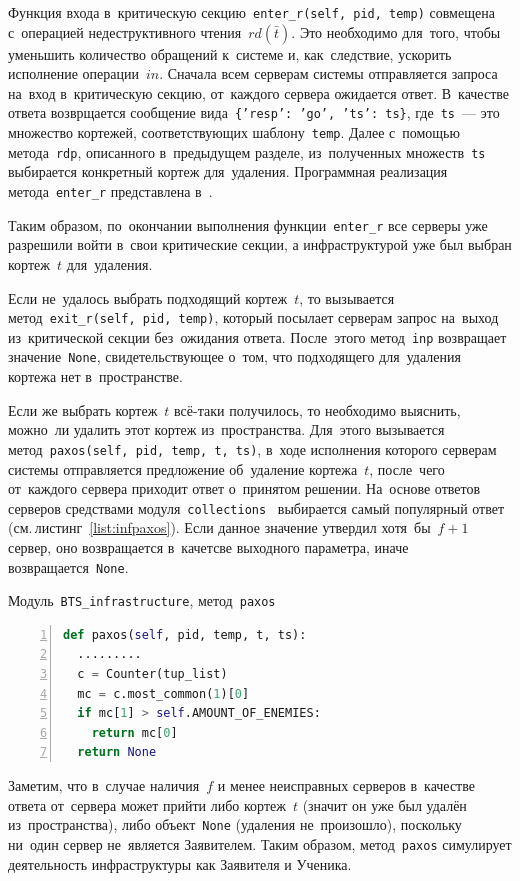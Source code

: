 Функция входа в~критическую секцию~\texttt{enter_r(self, pid, temp)} совмещена с~операцией недеструктивного чтения~$rd(\bar t)$. Это необходимо для~того, чтобы уменьшить количество обращений к~системе и, как~следствие, ускорить исполнение операции~$in$. Сначала всем серверам системы отправляется запроса на~вход в~критическую секцию, от~каждого сервера ожидается ответ. В~качестве ответа возврщается сообщение вида~\texttt{\{'resp': 'go', 'ts': ts\}}, где~\texttt{ts}~--- это множество кортежей, соответствующих шаблону~\texttt{temp}. Далее с~помощью метода~\texttt{rdp}, описанного в~предыдущем разделе, из~полученных множеств~\texttt{ts} выбирается конкретный кортеж для~удаления. Программная реализация метода~\texttt{enter_r} представлена в~\autocite{mybts}.
		
Таким образом, по~окончании выполнения функции~\texttt{enter_r} все серверы уже разрешили войти в~свои критические секции, а инфраструктурой уже был выбран кортеж~$t$ для~удаления.

Если не~удалось выбрать подходящий кортеж~$t$, то вызывается метод~\texttt{exit_r(self, pid, temp)}, который посылает серверам запрос на~выход из~критической секции без~ожидания ответа. После~этого метод~\texttt{inp} возвращает значение~\texttt{None}, свидетельствующее о~том, что подходящего для~удаления кортежа нет в~пространстве.

Если же выбрать кортеж~$t$ всё-таки получилось, то необходимо выяснить, можно~ли удалить этот кортеж из~пространства. Для~этого вызывается метод~\texttt{paxos(self, pid, temp, t, ts)}, в~ходе исполнения которого серверам системы отправляется предложение об~удаление кортежа~$t$, после~чего от~каждого сервера приходит ответ о~принятом решении. На~основе ответов серверов средствами модуля~\texttt{collections}~\autocite{collections} выбирается самый популярный ответ (см.\,листинг~\ref{list:infpaxos}). Если данное значение утвердил хотя~бы~$f + 1$ сервер, оно возвращается в~качетсве выходного параметра, иначе возвращается~\texttt{None}.
\begin{ListingEnv}\caption{Модуль~\texttt{BTS\_infrastructure}, метод~\texttt{paxos}}\label{list:infpaxos}
	\begin{lstlisting}[language=Python, numbers=left]
def paxos(self, pid, temp, t, ts):
  .........
  c = Counter(tup_list)
  mc = c.most_common(1)[0]
  if mc[1] > self.AMOUNT_OF_ENEMIES:
    return mc[0]
  return None
	\end{lstlisting}
\end{ListingEnv}
Заметим, что в~случае наличия~$f$ и менее неисправных серверов в~качестве ответа от~сервера может прийти либо кортеж~$t$ (значит он уже был удалён из~пространства), либо объект~\texttt{None} (удаления не~произошло), поскольку ни~один сервер не~является Заявителем. Таким образом, метод~\texttt{paxos} симулирует деятельность инфраструктуры как Заявителя и Ученика.

